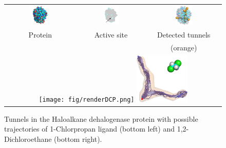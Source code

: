 \documentclass{bmcart}
\begin{document}
\begin{figure}[t]
\centering
{\footnotesize
\renewcommand{\arraystretch}{-0.5}
\renewcommand{\tabcolsep}{-1pt}
\begin{tabular}{ccc}
\includegraphics[width=0.24\textwidth]
{fig/motiv1} &
\includegraphics[width=0.25\textwidth]
{fig/motiv2lab} &
\includegraphics[width=0.24\textwidth]
{fig/motiv3}  \\
Protein  & Active site & Detected tunnels \\ %
             &            & (orange)         \\  %
\multicolumn{3}{c}{%
\texttt{[image: fig/renderDCP.png]}  \hskip 15pt
\includegraphics[width=0.24\textwidth]
{fig/render37t.png}} \\ 
\end{tabular}
}
\caption{\label{fig::motiv}
    \small
    Tunnels in the Haloalkane dehalogenase protein with possible trajectories of 1-Chlorpropan ligand (bottom left) and 1,2-Dichloroethane (bottom right).
}
\end{figure}
\end{document}
